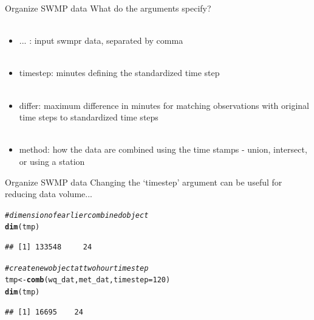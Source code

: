 \documentclass[xcolor=svgnames]{beamer}\usepackage[]{graphicx}\usepackage[]{color}
\makeatletter
\newcommand{\hlnum}[1]{\textcolor[rgb]{0.686,0.059,0.569}{#1}}%
\newcommand{\hlcom}[1]{\textcolor[rgb]{0.678,0.584,0.686}{\textit{#1}}}%
\newcommand{\hlstd}[1]{\textcolor[rgb]{0.345,0.345,0.345}{#1}}%
\newcommand{\hlkwb}[1]{\textcolor[rgb]{0.69,0.353,0.396}{#1}}%
\newcommand{\hlkwc}[1]{\textcolor[rgb]{0.333,0.667,0.333}{#1}}%
\newcommand{\hlkwd}[1]{\textcolor[rgb]{0.737,0.353,0.396}{\textbf{#1}}}%
\newenvironment{kframe}{%
 \def\at@end@of@kframe{}%
 \ifinner\ifhmode%
  \def\at@end@of@kframe{\end{minipage}}%
  \begin{minipage}{\columnwidth}%
 \fi\fi%
 \def\FrameCommand##1{\hskip\@totalleftmargin \hskip-\fboxsep
 \colorbox{shadecolor}{##1}\hskip-\fboxsep
     \hskip-\linewidth \hskip-\@totalleftmargin \hskip\columnwidth}%
 \MakeFramed {\advance\hsize-\width
   \@totalleftmargin\z@ \linewidth\hsize
   \@setminipage}}%
 {\par\unskip\endMakeFramed%
 \at@end@of@kframe}
\newenvironment{knitrout}{}{} %
\makeatother
\begin{document}
\begin{frame}[containsverbatim]{Organize SWMP data}
What do the arguments specify? \\~\\
\begin{itemize}
\item ... : input swmpr data, separated by comma\\~\\
\item timestep: minutes defining the standardized time step\\~\\
\item differ: maximum difference in minutes for matching observations with original time steps to standardized time steps \\~\\
\item method: how the data are combined using the time stamps - union, intersect, or using a station
\end{itemize}
\end{frame}

\begin{frame}[containsverbatim]{Organize SWMP data}
Changing the `timestep' argument can be useful for reducing data volume...
\begin{knitrout}\scriptsize
{}\color{fgcolor}\begin{kframe}
\begin{alltt}
\hlcom{# dimension of earlier combined object}
\hlkwd{dim}\hlstd{(tmp)}
\end{alltt}
\begin{verbatim}
## [1] 133548     24
\end{verbatim}
\begin{alltt}
\hlcom{# create new object at two hour time step}
\hlstd{tmp} \hlkwb{<-} \hlkwd{comb}\hlstd{(wq_dat, met_dat,} \hlkwc{timestep} \hlstd{=} \hlnum{120}\hlstd{)}
\hlkwd{dim}\hlstd{(tmp)}
\end{alltt}
\begin{verbatim}
## [1] 16695    24
\end{verbatim}
\end{kframe}
\end{knitrout}
\end{frame}
\end{document}
